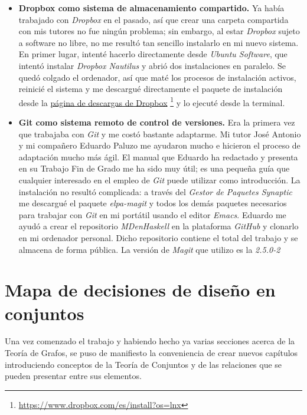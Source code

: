 \begin{itemize}
  \item \textbf{Dropbox como sistema de almacenamiento compartido.} Ya había 
    trabajado con \textit{Dropbox} en el pasado, así que crear una carpeta 
    compartida con mis tutores no fue ningún problema; sin embargo, al estar
    \textit{Dropbox} sujeto a software no libre, no me resultó tan sencillo
    instalarlo en mi nuevo sistema. En primer lugar, intenté hacerlo 
    directamente desde \textit{Ubuntu Software}, que intentó instalar 
    \textit{Dropbox Nautilus} y abrió dos instalaciones en paralelo. Se quedó 
    colgado el ordenador, así que maté los procesos de instalación activos,
    reinicié el sistema y me descargué directamente el paquete de instalación
    desde la 
    \href{https://www.dropbox.com/es/install?os=lnx}
    {página de descargas de Dropbox}
    \footnote{\url{https://www.dropbox.com/es/install?os=lnx}} y lo ejecuté
    desde la terminal.
  \item \textbf{Git como sistema remoto de control de versiones.} Era la 
    primera vez que trabajaba con \textit{Git} y me costó bastante adaptarme.
    Mi tutor José Antonio y mi compañero Eduardo Paluzo me ayudaron mucho e
    hicieron el proceso de adaptación mucho más ágil. 
    El manual que Eduardo ha redactado y presenta en su Trabajo Fin de Grado
    me ha sido muy útil; es una pequeña guía que cualquier interesado en el
    empleo de \textit{Git} puede utilizar como introducción.
    La instalación no resultó complicada: a través del \textit{Gestor de 
    Paquetes Synaptic} me descargué el paquete \textit{elpa-magit} y todos
    los demás paquetes necesarios para trabajar con \textit{Git} en mi
    portátil usando el editor \textit{Emacs}.
    Eduardo me ayudó a crear el repositorio \textit{MDenHaskell} en la 
    plataforma \textit{GitHub} y clonarlo en mi ordenador personal. Dicho
    repositorio contiene el total del trabajo y se almacena de forma pública.
    La versión de \textit{Magit} que utilizo es la \textit{2.5.0-2}
\end{itemize}


\section{Mapa de decisiones de diseño en conjuntos}

Una vez comenzado el trabajo y habiendo hecho ya varias secciones acerca de la
Teoría de Grafos, se puso de manifiesto la conveniencia de crear nuevos 
capítulos introduciendo conceptos de la Teoría de Conjuntos y de las relaciones
que se pueden presentar entre sus elementos. 

